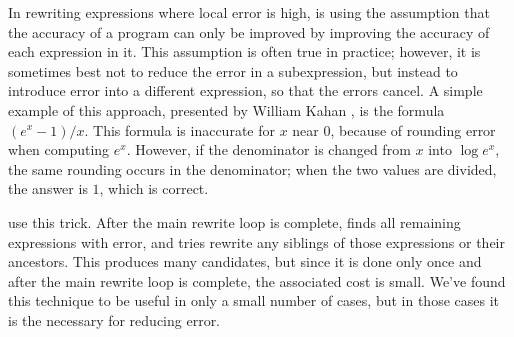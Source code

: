 \documentclass[paper.tex]{subfiles}
\begin{document}
In rewriting expressions where local error is high,
  \casio is using the assumption
  that the accuracy of a program can only be improved
  by improving the accuracy of each expression in it.
This assumption is often true in practice;
  however, it is sometimes best not to reduce the error in a subexpression,
  but instead to introduce error into a different expression,
  so that the errors cancel.
A simple example of this approach,
  presented by William Kahan ,
  is the formula $(e^x - 1) / x$.
This formula is inaccurate for $x$ near $0$,
  because of rounding error when computing $e^x$.
However, if the denominator is changed from $x$ into $\log e^x$,
  the same rounding occurs in the denominator;
  when the two values are divided, the answer is $1$, which is correct.

\casio use this trick.
After the main rewrite loop is complete,
  \casio finds all remaining expressions with error,
  and tries rewrite any siblings of those expressions or their ancestors.
This produces many candidates, but since it is done only once
  and after the main rewrite loop is complete, the associated cost is small.
We've found this technique to be useful in only a small number of cases,
  but in those cases it is the necessary for reducing error.
\end{document}
